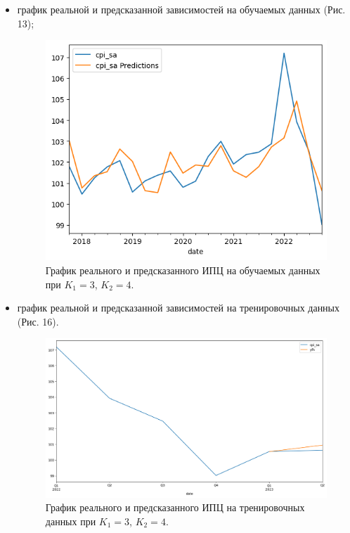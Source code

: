 \documentclass[a4paper, 12pt]{extarticle}
\begin{document}
\begin{enumerate}
\begin{itemize}
			\item график реальной и предсказанной зависимостей на обучаемых данных  (Рис. 13); 
				\begin{figure}[h!]
					\centering
					\includegraphics[scale=0.75]{images/pic_15}
					\caption[Рис. 15]{График реального и предсказанного ИПЦ на обучаемых данных при $K_1 = 3$, $K_2 = 4$.}
					\label{fig:pic15}
				\end{figure}
			
			\item график реальной и предсказанной зависимостей на тренировочных данных  (Рис. 16). 
				\begin{figure}[h!]
					\centering
					\includegraphics[scale=0.35]{images/pic_16}
					\caption[Рис. 16]{График реального и предсказанного ИПЦ на тренировочных данных при $K_1 = 3$, $K_2 = 4$.}
					\label{fig:pic16}
				\end{figure}
			
			\end{itemize}
		\end{enumerate}
			
\end{document}
